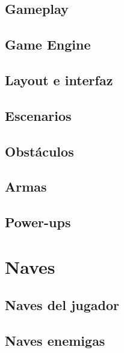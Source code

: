 \documentclass[12pt, spanish, a4paper]{article}
\begin{document}
	\subsection{Gameplay}

	\lipsum[11]
	
	\subsection{Game Engine}
	
	\lipsum[12]
	
	\subsection{Layout e interfaz}
	
	\lipsum[13]
	
	\subsection{Escenarios}
	
	\lipsum[14]
	
	\subsection{Obstáculos}
	
	\lipsum[15]
	
	\subsection{Armas}
	
	\lipsum[16]
	
	\subsection{Power-ups}
	
	\lipsum[17]
	
	\section{Naves}
	
	\lipsum[18]
	
	\subsection{Naves del jugador}
	
	\lipsum[19]
	
	\subsection{Naves enemigas}
	
\end{document}
